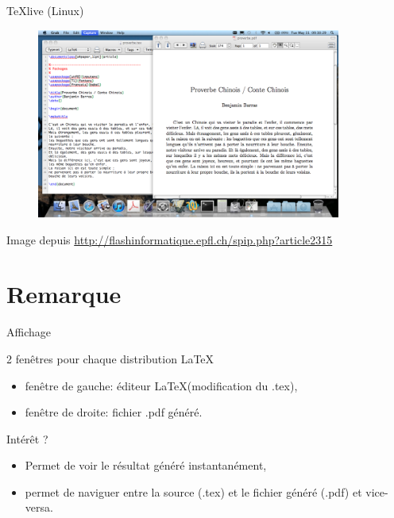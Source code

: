 \documentclass{beamer}
\begin{document}

\begin{frame}{TeXlive (Linux)}

\begin{figure}
\centering
\includegraphics[width=10cm]{img/texlive_1}
\end{figure}

{\footnotesize Image depuis \url{http://flashinformatique.epfl.ch/spip.php?article2315}}

\end{frame}


\section{Remarque} 


\begin{frame}{Affichage}

2 fenêtres pour chaque distribution  \LaTeX
    \begin{itemize}
        \item fenêtre de gauche: éditeur \LaTeX (modification du .tex),
        \item fenêtre de droite: fichier .pdf généré.
    \end{itemize}


Intérêt ?
    \begin{itemize}
        \item Permet de voir le résultat généré instantanément, 
        \item permet de naviguer entre la source (.tex) et le fichier généré (.pdf) et vice-versa. 
    \end{itemize}

\end{frame}


\end{document}
